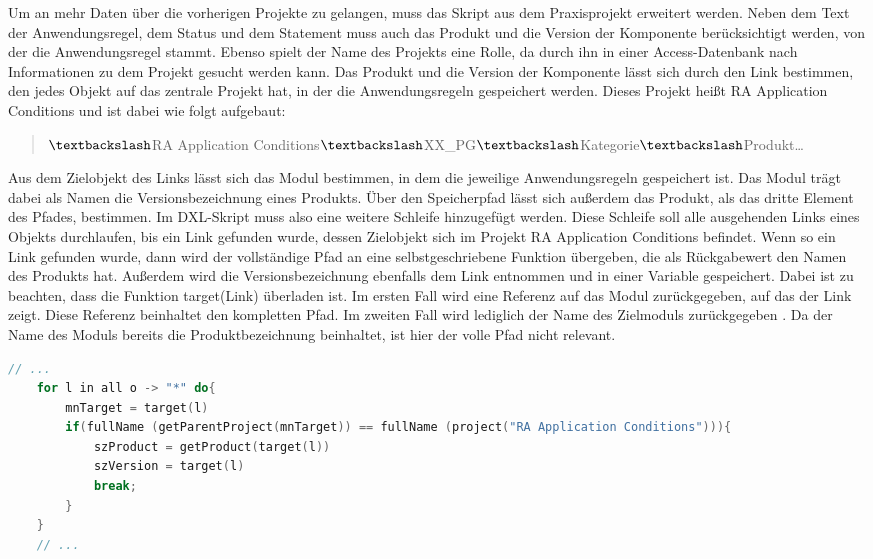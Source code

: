 Um an mehr Daten über die vorherigen Projekte zu gelangen, muss das Skript aus dem Praxisprojekt erweitert werden. Neben dem Text der Anwendungsregel, dem Status und dem Statement
muss auch das Produkt und die Version der Komponente berücksichtigt werden, von der die Anwendungsregel stammt. Ebenso spielt der Name des Projekts eine Rolle,
da durch ihn in einer Access-Datenbank nach Informationen zu dem Projekt gesucht werden kann. 
Das Produkt und die Version der Komponente lässt sich durch den Link bestimmen, den jedes Objekt auf das zentrale Projekt hat, in der die Anwendungsregeln gespeichert werden.
Dieses Projekt heißt RA Application Conditions und ist dabei wie folgt aufgebaut:

\begin{quotation}
    $\textbackslash$RA Application Conditions$\textbackslash$XX\_PG$\textbackslash$Kategorie$\textbackslash$Produkt\dots
\end{quotation}

Aus dem Zielobjekt des Links lässt sich das Modul bestimmen, in dem die jeweilige Anwendungsregeln gespeichert ist. Das Modul trägt dabei als Namen die Versionsbezeichnung eines Produkts.
Über den Speicherpfad lässt sich außerdem das Produkt, als das dritte Element des Pfades, bestimmen. Im \ac{DXL}-Skript muss also eine weitere Schleife hinzugefügt werden.
Diese Schleife soll alle ausgehenden Links eines Objekts durchlaufen, bis ein Link gefunden wurde, dessen Zielobjekt sich im Projekt RA Application Conditions befindet.
Wenn so ein Link gefunden wurde, dann wird der vollständige Pfad an eine selbstgeschriebene Funktion übergeben, die als Rückgabewert den Namen des Produkts hat.
Außerdem wird die Versionsbezeichnung ebenfalls dem Link entnommen und in einer Variable gespeichert. Dabei ist zu beachten, dass die Funktion target(Link) überladen ist.
Im ersten Fall wird eine Referenz auf das Modul zurückgegeben, auf das der Link zeigt. Diese Referenz beinhaltet den kompletten Pfad. Im zweiten Fall wird lediglich der Name des Zielmoduls 
zurückgegeben \cite[vgl. S.391]{DXL}. Da der Name des Moduls bereits die Produktbezeichnung beinhaltet, ist hier der volle Pfad nicht relevant.

\begin{lstlisting}[language = C++, caption={Produkt- und Versionsbezeichnung bestimmen},captionpos=b, label = lst:getProductVersion, float, floatplacement=H]
    // ...
    for l in all o -> "*" do{
        mnTarget = target(l)
        if(fullName (getParentProject(mnTarget)) == fullName (project("RA Application Conditions"))){
            szProduct = getProduct(target(l)) 
            szVersion = target(l)
            break;
        } 
    }
    // ...
\end{lstlisting}


